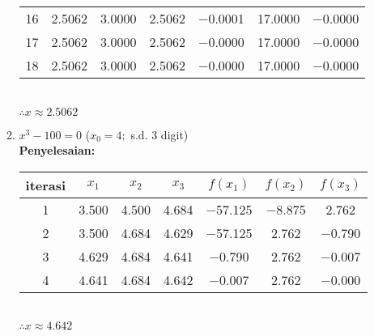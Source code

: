 \documentclass{article}
\newcommand{\penyelesaian}{\textbf{Penyelesaian: }}
\begin{document}
\begin{enumerate}
\begin{enumerate}
\begin{tabular}{|c|c|c|c|c|c|c|}
            16 & \num{2,5062} & \num{3,0000} & \num{2,5062} & \num{-0,0001} & \num{17,0000} & \num{-0,0000}\\
            17 & \num{2,5062} & \num{3,0000} & \num{2,5062} & \num{-0,0000} & \num{17,0000} & \num{-0,0000}\\
            18 & \num{2,5062} & \num{3,0000} & \num{2,5062} & \num{-0,0000} & \num{17,0000} & \num{-0,0000}\\
             \hline
            \end{tabular}       \\
        $\therefore x \approx \num{2,5062}$
             
        \item $x^3 - 100 = 0$ ($x_0 = \num{4};$ s.d. 3 digit) \\
        \penyelesaian \\
        \begin{tabular}{|c|c|c|c|c|c|c|}
            \hline
            iterasi & $x_1$ & $x_2$ & $x_3$ & $f(x_1)$ & $f(x_2)$ & $f(x_3)$ \\
            \hline
            1 & \num{3,500} & \num{4,500} & \num{4,684} & \num{-57,125} & \num{-8,875} & \num{2,762}\\
            2 & \num{3,500} & \num{4,684} & \num{4,629} & \num{-57,125} & \num{2,762} & \num{-0,790}\\
            3 & \num{4,629} & \num{4,684} & \num{4,641} & \num{-0,790} & \num{2,762} & \num{-0,007}\\
            4 & \num{4,641} & \num{4,684} & \num{4,642} & \num{-0,007} & \num{2,762} & \num{-0,000}\\
             \hline
            \end{tabular} \\           
        $\therefore x \approx \num{4,642}$

    \end{enumerate}


\end{enumerate}
\end{document}
